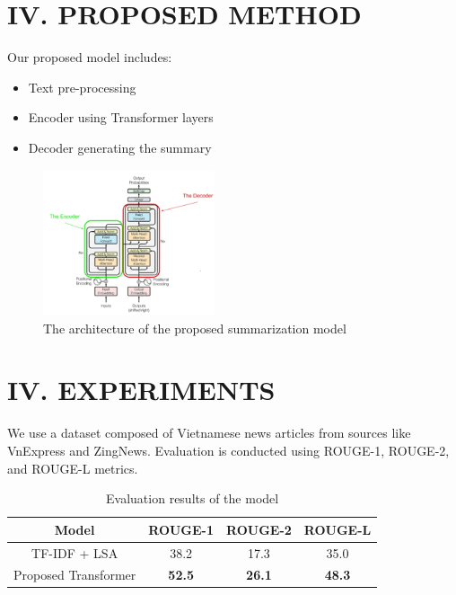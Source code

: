 \documentclass{article}
\begin{document}
\section*{IV. PROPOSED METHOD}
Our proposed model includes:

\begin{itemize}[noitemsep]
  \item Text pre-processing
  \item Encoder using Transformer layers
  \item Decoder generating the summary
\end{itemize}

\begin{figure}[H]
\centering
\includegraphics[width=0.45\textwidth]{img/imagesAttention.png}
\caption{The architecture of the proposed summarization model}
\end{figure}

\vspace{1em}
\section*{IV. EXPERIMENTS}
We use a dataset composed of Vietnamese news articles from sources like VnExpress and ZingNews. Evaluation is conducted using ROUGE-1, ROUGE-2, and ROUGE-L metrics.

\begin{table}[H]
\centering
\caption{Evaluation results of the model}
\begin{tabular}{|c|c|c|c|}
\hline
\textbf{Model} & \textbf{ROUGE-1} & \textbf{ROUGE-2} & \textbf{ROUGE-L} \\
\hline
TF-IDF + LSA & 38.2 & 17.3 & 35.0 \\
Proposed Transformer & \textbf{52.5} & \textbf{26.1} & \textbf{48.3} \\
\hline
\end{tabular}
\end{table}

\vspace{1em}
\end{document}
